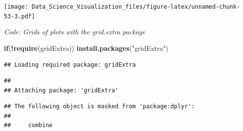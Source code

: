 \documentclass[
]{article}
\newenvironment{Shaded}{\begin{snugshade}}{\end{snugshade}}
\newcommand{\CommentTok}[1]{\textcolor[rgb]{0.56,0.35,0.01}{\textit{#1}}}
\newcommand{\ControlFlowTok}[1]{\textcolor[rgb]{0.13,0.29,0.53}{\textbf{#1}}}
\newcommand{\DataTypeTok}[1]{\textcolor[rgb]{0.13,0.29,0.53}{#1}}
\newcommand{\DecValTok}[1]{\textcolor[rgb]{0.00,0.00,0.81}{#1}}
\newcommand{\KeywordTok}[1]{\textcolor[rgb]{0.13,0.29,0.53}{\textbf{#1}}}
\newcommand{\NormalTok}[1]{#1}
\newcommand{\OperatorTok}[1]{\textcolor[rgb]{0.81,0.36,0.00}{\textbf{#1}}}
\newcommand{\StringTok}[1]{\textcolor[rgb]{0.31,0.60,0.02}{#1}}
\begin{document}
\texttt{[image: Data\_Science\_Visualization\_files/figure-latex/unnamed-chunk-53-3.pdf]}

\emph{Code: Grids of plots with the grid.extra package}

\begin{Shaded}
\begin{Highlighting}[]
\ControlFlowTok{if}\NormalTok{(}\OperatorTok{!}\KeywordTok{require}\NormalTok{(gridExtra)) }\KeywordTok{install.packages}\NormalTok{(}\StringTok{"gridExtra"}\NormalTok{)}
\end{Highlighting}
\end{Shaded}

\begin{verbatim}
## Loading required package: gridExtra
\end{verbatim}

\begin{verbatim}
## 
## Attaching package: 'gridExtra'
\end{verbatim}

\begin{verbatim}
## The following object is masked from 'package:dplyr':
## 
##     combine
\end{verbatim}

\begin{Shaded}
\end{Shaded}
\end{document}
